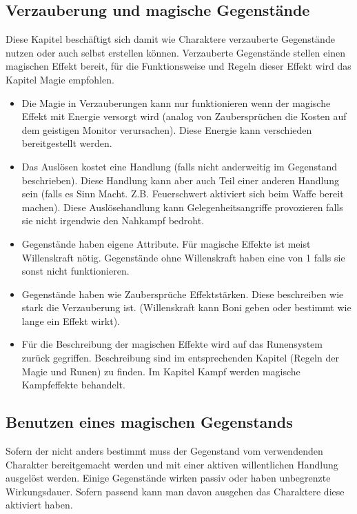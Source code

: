 \documentclass{article}
\begin{document}
\begin{center}
\section{Verzauberung und magische Gegenstände}
\end{center}

Diese Kapitel beschäftigt sich damit wie Charaktere verzauberte Gegenstände nutzen oder auch selbst erstellen können.
Verzauberte Gegenstände stellen einen magischen Effekt bereit, für die Funktionsweise und Regeln dieser Effekt wird
das Kapitel Magie empfohlen.

\begin{itemize}
\item Die Magie in Verzauberungen kann nur funktionieren wenn der magische Effekt mit Energie versorgt wird (analog von Zaubersprüchen die Kosten auf dem geistigen Monitor verursachen). Diese Energie kann verschieden bereitgestellt werden.
\item Das Auslösen kostet eine Handlung (falls nicht anderweitig im Gegenstand beschrieben). Diese Handlung kann aber auch Teil einer anderen Handlung sein (falls es Sinn Macht. Z.B. Feuerschwert aktiviert sich beim Waffe bereit machen). Diese Auslösehandlung kann Gelegenheitsangriffe provozieren falls sie nicht irgendwie den Nahkampf bedroht.
\item Gegenstände haben eigene Attribute. Für magische Effekte ist meist Willenskraft nötig. Gegenstände ohne Willenskraft haben eine von 1 falls sie sonst nicht funktionieren.
\item Gegenstände haben wie Zaubersprüche Effektstärken. Diese beschreiben wie stark die Verzauberung ist. (Willenskraft kann Boni geben oder bestimmt wie lange ein Effekt wirkt).
\item Für die Beschreibung der magischen Effekte wird auf das Runensystem zurück gegriffen. Beschreibung sind im entsprechenden Kapitel (Regeln der Magie und Runen) zu finden. Im Kapitel Kampf werden magische Kampfeffekte behandelt.
\end{itemize}

\begin{center}
\subsection{Benutzen eines magischen Gegenstands}
\end{center}

Sofern der nicht anders bestimmt muss der Gegenstand vom verwendenden Charakter bereitgemacht werden und mit einer
aktiven willentlichen Handlung ausgelöst werden. Einige Gegenstände wirken passiv oder haben unbegrenzte
Wirkungsdauer. Sofern passend kann man davon ausgehen das Charaktere diese aktiviert haben.
\end{document}
